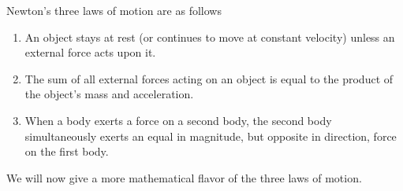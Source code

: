 Newton's three laws of motion are as follows
\begin{enumerate}
\item  An object stays at rest (or continues to move at constant velocity) unless an external force acts upon it.
\item The sum of all external forces acting on an object is equal to the product of the object's mass and acceleration.
\item When a body exerts a force on a second body, the second body simultaneously exerts an equal in magnitude, but opposite in direction, force on the first body.
\end{enumerate}

We will now give a more mathematical flavor of the three laws of motion.\\

